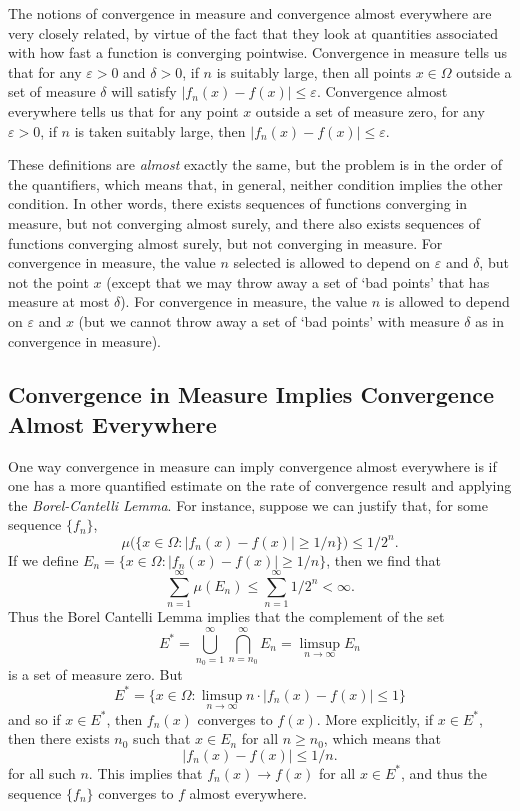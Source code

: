 \documentclass[answers]{exam}
\theoremstyle{problemstyle}
\newcommand{\1}[1]{\textbf{1}_{\left[#1\right]}} %
\begin{document}
The notions of convergence in measure and convergence almost everywhere are very closely related, by virtue of the fact that they look at quantities associated with how fast a function is converging pointwise. Convergence in measure tells us that for any $\varepsilon > 0$ and $\delta > 0$, if $n$ is suitably large, then all points $x \in \Omega$ outside a set of measure $\delta$ will satisfy $|f_n(x) - f(x)| \leq \varepsilon$. Convergence almost everywhere tells us that for any point $x$ outside a set of measure zero, for any $\varepsilon > 0$, if $n$ is taken suitably large, then $|f_n(x) - f(x)| \leq \varepsilon$.

These definitions are \emph{almost} exactly the same, but the problem is in the order of the quantifiers, which means that, in general, neither condition implies the other condition. In other words, there exists sequences of functions converging in measure, but not converging almost surely, and there also exists sequences of functions converging almost surely, but not converging in measure. For convergence in measure, the value $n$ selected is allowed to depend on $\varepsilon$ and $\delta$, but not the point $x$ (except that we may throw away a set of `bad points' that has measure at most $\delta$). For convergence in measure, the value $n$ is allowed to depend on $\varepsilon$ and $x$ (but we cannot throw away a set of `bad points' with measure $\delta$ as in convergence in measure).

\subsection*{Convergence in Measure Implies Convergence Almost Everywhere}

One way convergence in measure can imply convergence almost everywhere is if one has a more quantified estimate on the rate of convergence result and applying the \emph{Borel-Cantelli Lemma}. For instance, suppose we can justify that, for some sequence $\{ f_n \}$,
%
\[ \mu \Big( \{ x \in \Omega : |f_n(x) - f(x)| \geq 1/n \} \Big) \leq 1/2^n. \]
%
If we define $E_n = \{ x \in \Omega : |f_n(x) - f(x)| \geq 1/n \}$, then we find that
%
\[ \sum_{n = 1}^\infty \mu(E_n) \leq \sum_{n = 1}^\infty 1/2^n < \infty. \]
%
Thus the Borel Cantelli Lemma implies that the complement of the set
%
\[ E^* = \bigcup_{n_0 = 1}^\infty \bigcap_{n = n_0}^\infty E_n = \limsup_{n \to \infty} E_n \]
%
is a set of measure zero. But
%
\[ E^* = \{ x \in \Omega : \limsup_{n \to \infty} n \cdot |f_n(x) - f(x)| \leq 1 \} \]
%
and so if $x \in E^*$, then $f_n(x)$ converges to $f(x)$. More explicitly, if $x \in E^*$, then there exists $n_0$ such that $x \in E_n$ for all $n \geq n_0$, which means that
%
\[ |f_n(x) - f(x)| \leq 1/n. \]
%
for all such $n$. This implies that $f_n(x) \to f(x)$ for all $x \in E^*$, and thus the sequence $\{ f_n \}$ converges to $f$ almost everywhere.
\end{document}
